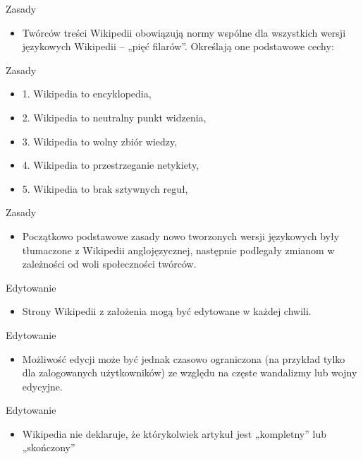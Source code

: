 \documentclass{beamer}
\begin{document}
 \begin{frame}{Zasady} \begin{itemize} \item Twórców treści Wikipedii obowiązują normy wspólne dla wszystkich wersji językowych Wikipedii – „pięć filarów”. Określają one podstawowe cechy: 
 
 \end{itemize} \end{frame}
 
 \begin{frame}{Zasady} \begin{itemize} \item 1. Wikipedia to encyklopedia,
 \item 2. Wikipedia to neutralny punkt widzenia,
 \item 3. Wikipedia to wolny zbiór wiedzy,
 \item 4. Wikipedia to przestrzeganie netykiety,
 \item 5. Wikipedia to brak sztywnych reguł,
 
 \end{itemize} \end{frame}
 
 \begin{frame}{Zasady} \begin{itemize} \item Początkowo podstawowe zasady nowo tworzonych wersji językowych były tłumaczone z Wikipedii anglojęzycznej, następnie podlegały zmianom w zależności od woli społeczności twórców. 
 
 \end{itemize} \end{frame}
 
 
 
 
 \begin{frame}{Edytowanie} \begin{itemize} 
 \item  Strony Wikipedii z założenia mogą być edytowane w każdej chwili. 
 
 \end{itemize} \end{frame}
 
 \begin{frame}{Edytowanie} \begin{itemize} 
 \item  Możliwość edycji może być jednak czasowo ograniczona (na przykład tylko dla zalogowanych użytkowników) ze względu na częste wandalizmy lub wojny edycyjne. 
 
 \end{itemize} \end{frame}
 
 \begin{frame}{Edytowanie} \begin{itemize} 
 \item Wikipedia nie deklaruje, że którykolwiek artykuł jest „kompletny” lub „skończony” 
 
 \end{itemize} \end{frame}
\end{document}
